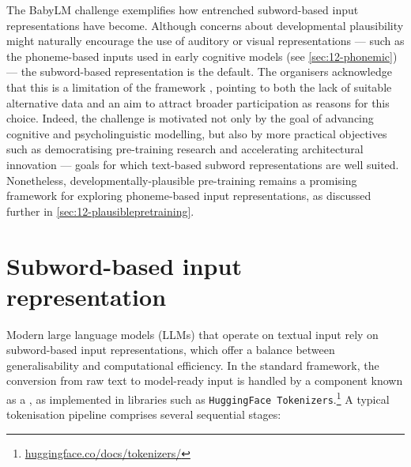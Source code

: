 The BabyLM challenge exemplifies how entrenched subword-based input representations have become. Although concerns about developmental plausibility might naturally encourage the use of auditory or visual representations --- such as the phoneme-based inputs used in early cognitive models (see \cref{sec:12-phonemic}) --- the subword-based representation is the default. The organisers acknowledge that this is a limitation of the framework \citep{wilcox2025bigger}, pointing to both the lack of suitable alternative data and an aim to attract broader participation as reasons for this choice. Indeed, the challenge is motivated not only by the goal of advancing cognitive and psycholinguistic modelling, but also by more practical objectives such as democratising pre-training research and accelerating architectural innovation --- goals for which text-based subword representations are well suited. Nonetheless, developmentally-plausible pre-training remains a promising framework for exploring phoneme-based input representations, as discussed further in \cref{sec:12-plausiblepretraining}.


\section{Subword-based input representation}\label{sec:12-subword}

Modern large language models (LLMs) that operate on textual input rely on subword-based input representations, which offer a balance between generalisability and computational efficiency. In the standard framework, the conversion from raw text to model-ready input is handled by a component known as a , as implemented in libraries such as \texttt{HuggingFace Tokenizers}.\footnote{\href{https://huggingface.co/docs/tokenizers/index}{huggingface.co/docs/tokenizers/}} A typical tokenisation pipeline comprises several sequential stages:

